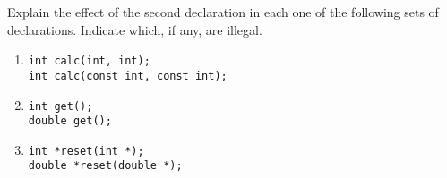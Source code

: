 %
%
\begin{question}
Explain the effect of the second declaration in each one of
the following sets of declarations. Indicate which, if any, are illegal.
\begin{enumerate}[label=(\alph*)]
^^I\item
\begin{lstlisting}
int calc(int, int);
int calc(const int, const int);
\end{lstlisting}

^^I\item
\begin{lstlisting}
int get();
double get();
\end{lstlisting}

^^I\item
\begin{lstlisting}
int *reset(int *);
double *reset(double *);
\end{lstlisting}
\end{enumerate}
\end{question}
